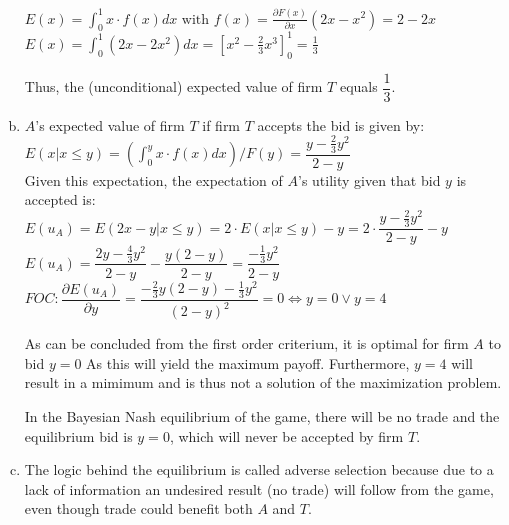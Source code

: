 \documentclass[a4paper]{article}
\begin{document}
\begin{enumerate}[(a)]
$E(x)=\int_0^1x\cdot f(x)dx \text{ with } f(x)=\frac{\partial F(x)}{\partial x}(2x-x^2)=2-2x$\\
$E(x)=\int_0^1\left(2x-2x^2\right)dx=\left[x^2-\frac{2}{3}x^3\right]_0^1=\frac{1}{3}$

Thus, the (unconditional) expected value of firm $T$ equals $\dfrac{1}{3}$.
\\
\item
$A$'s expected value of firm $T$ if firm $T$ accepts the bid is given by:\\
$E(x|x\le y)=\left(\int_0^yx\cdot f(x)dx\right)\big/F(y)=\dfrac{y-\frac{2}{3}y^2}{2-y}$\\

Given this expectation, the expectation of $A$'s utility given that bid $y$ is accepted is:\\
$E(u_A)=E(2x-y|x\le y)=2\cdot E(x|x\le y)-y=2\cdot\dfrac{y-\frac{2}{3}y^2}{2-y}-y$\\
$E(u_A)=\dfrac{2y-\frac{4}{3}y^2}{2-y}-\dfrac{y(2-y)}{2-y}=\dfrac{-\frac{1}{3}y^2}{2-y}$\\
$FOC: \dfrac{\partial E(u_A)}{\partial y}=\dfrac{-\frac{2}{3}y(2-y)-\frac{1}{3}y^2}{(2-y)^2}=0 \iff y=0 \vee y=4$

As can be concluded from the first order criterium, it is optimal for firm $A$ to bid $y=0$ As this will yield the maximum payoff. Furthermore, $y=4$ will result in a mimimum and is thus not a solution of the maximization problem.

In the Bayesian Nash equilibrium of the game, there will be no trade and the equilibrium bid is $y=0$, which will never be accepted by firm $T$. 
\item
The logic behind the equilibrium is called adverse selection because due to a lack of information an undesired result (no trade) will follow from the game, even though trade could benefit both $A$ and $T$.

\end{enumerate}
\end{document}
